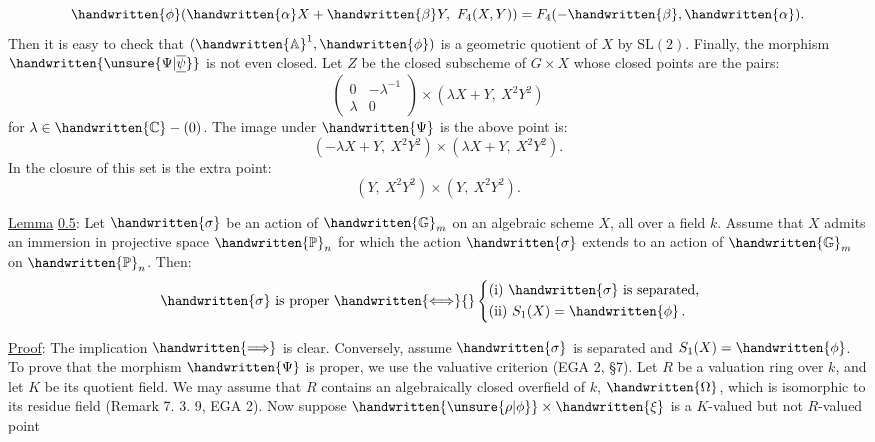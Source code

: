\[
\handwritten{\phi}(\handwritten{\alpha}X+\handwritten{\beta}Y,\ F_4(X,Y))=F_4(-\handwritten{\beta},\handwritten{\alpha}).
\]
Then it is easy to check that $(\handwritten{\mathbb A}^{1},\handwritten{\phi})$ is a geometric quotient of $X$ by $\mathrm{SL}(2)$. Finally, the morphism $\handwritten{\unsure{\Psi|\overline{\underline\psi}}}$ is not even closed. Let $Z$ be the closed subscheme of $G\times X$ whose closed points are the pairs:
\[
\begin{pmatrix}0&-\lambda^{-1}\\ \lambda&0\end{pmatrix}\times(\lambda X+Y,\ X^2Y^2)
\]
for $\lambda\in\handwritten{\mathbb C}-(0)$. The image under $\handwritten{\Psi}$ is the above point is:
\[
(-\lambda X+Y,\ X^2Y^2)\times(\lambda X+Y,\ X^2Y^2).
\]
In the closure of this set is the extra point:
\[
(Y,\ X^2Y^2)\times(Y,\ X^2Y^2).
\]

\uline{Lemma} \uline{0.5}: Let $\handwritten{\sigma}$ be an action of $\handwritten{\mathbb G}_m$ on an algebraic scheme $X$, all over a field $k$. Assume that $X$ admits an immersion in projective space $\handwritten{\mathbb P}_n$ for which the action $\handwritten{\sigma}$ extends to an action of $\handwritten{\mathbb G}_m$ on $\handwritten{\mathbb P}_n$. Then:
\[
\begin{aligned}
\handwritten{\sigma}\text{ is proper }\handwritten{\Longleftrightarrow}{}&
\left\{\begin{aligned}
&\text{(i) }\handwritten{\sigma}\text{ is separated,}\\
&\text{(ii) }S_1(X)=\handwritten{\phi}\,.
\end{aligned}\right.
\end{aligned}
\]

\uline{Proof}: The implication $\handwritten{\Longrightarrow}$ is clear. Conversely, assume $\handwritten{\sigma}$ is separated and $S_1(X)=\handwritten{\phi}$. To prove that the morphism $\handwritten{\Psi}$ is proper, we use the valuative criterion (EGA 2, \S7). Let $R$ be a valuation ring over $k$, and let $K$ be its quotient field. We may assume that $R$ contains an algebraically closed overfield of $k$, $\handwritten{\Omega}$, which is isomorphic to its residue field (Remark 7. 3. 9, EGA 2). Now suppose $\handwritten{\unsure{\rho|\phi}}\times\handwritten{\xi}$ is a $K$-valued but not $R$-valued point
